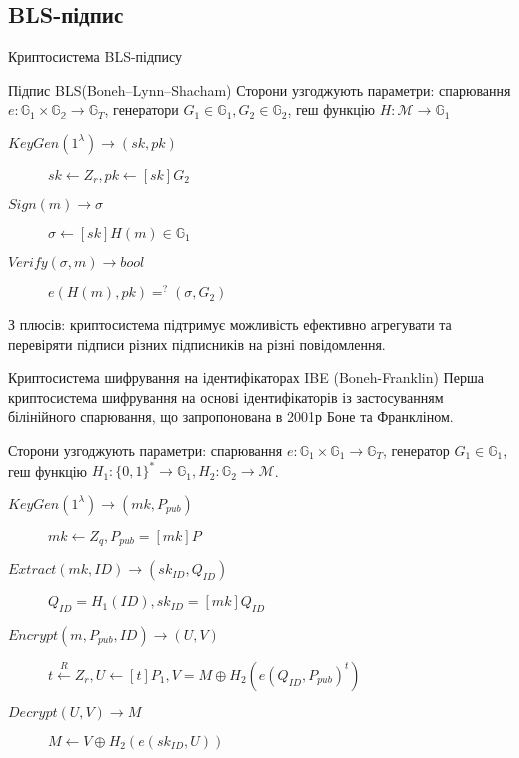 \documentclass[9pt]{beamer}
\begin{document}
\begin{darkframes}
\section{BLS-підпис}
\begin{frame}{Криптосистема BLS-підпису}
\begin{block}{Підпис BLS(Boneh–Lynn–Shacham)}
  Сторони узгоджують параметри: спарювання $e:\mathbb{G}_1 \times \mathbb{G_2} \to \mathbb{G}_T$, генератори $G_1 \in \mathbb{G}_1, G_2 \in \mathbb{G}_2$, геш функцію $H: \mathcal{M} \to \mathbb{G}_1$
  \begin{description}
      \item[$KeyGen(1^\lambda) \to (sk, pk)$] $sk \gets Z_r, pk \gets [sk]G_2$
      \item[$Sign(m) \to \sigma$] $\sigma \gets [sk]H(m) \in \mathbb{G}_1$
      \item[$Verify(\sigma, m) \to bool$] $e(H(m),pk) =^? (\sigma, G_2)$
  \end{description}
  \end{block}
  З плюсів: криптосистема підтримує можливість ефективно агрегувати та перевіряти підписи різних підписників на різні повідомлення. 
\end{frame}

\begin{frame}{Криптосистема шифрування на ідентифікаторах IBE (Boneh-Franklin)}
    Перша криптосистема шифрування на основі ідентифікаторів із застосуванням білінійного спарювання, що запропонована в 2001р Боне та Франкліном.
    
    Сторони узгоджують параметри: спарювання $e:\mathbb{G}_1 \times \mathbb{G}_1 \to \mathbb{G}_T$, генератор $G_1 \in \mathbb{G}_1$, геш функцію $H_1: \{0,1\}^* \to \mathbb{G}_1, H_2: \mathbb{G}_2 \to \mathcal{M}$.
      \begin{description}
      \item[$KeyGen(1^\lambda) \to (mk, P_{pub})$] $mk \gets Z_q, P_{pub}=[mk]P$
      \item[$Extract(mk, ID) \to (sk_{ID}, Q_{ID})$] $Q_{ID} = H_1(ID), sk_{ID}=[mk]Q_{ID}$
      \item[$Encrypt(m, P_{pub}, ID) \to (U,V)$] $t \xleftarrow{R}Z_r, U \gets [t]P_1, V=M \oplus H_2(e(Q_{ID}, P_{pub})^t)$
      \item[$Decrypt(U,V) \to M$] $M \gets V \oplus H_2(e(sk_{ID},U))$
  \end{description}
\end{frame}




  \end{darkframes}
\end{document}
